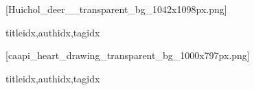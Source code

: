 

  \setcounter{chapter}{0}

  [Huichol_deer__transparent_bg_1042x1098px.png]
    \begin{songs}{titleidx,authidx,tagidx}
      
    \end{songs}

  [caapi_heart_drawing_transparent_bg_1000x797px.png]
    \begin{songs}{titleidx,authidx,tagidx}
      
    \end{songs}

